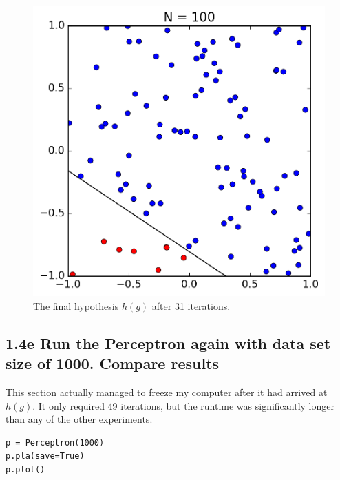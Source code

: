 \documentclass[11pt]{article}
\begin{document}
\begin{figure}[!htb]
	\includegraphics{14d.png}
	\caption{The final hypothesis $h(g)$ after 31 iterations.}
\end{figure}
\newpage

\subsection*{1.4e Run the Perceptron again with data set size of 1000. Compare results}

This section actually managed to freeze my computer after it had arrived at $h(g)$. It only required 49 iterations, but the runtime was significantly longer than any of the other experiments.

\begin{lstlisting}[frame=single]
p = Perceptron(1000)
p.pla(save=True)
p.plot()
\end{lstlisting}
\end{document}
